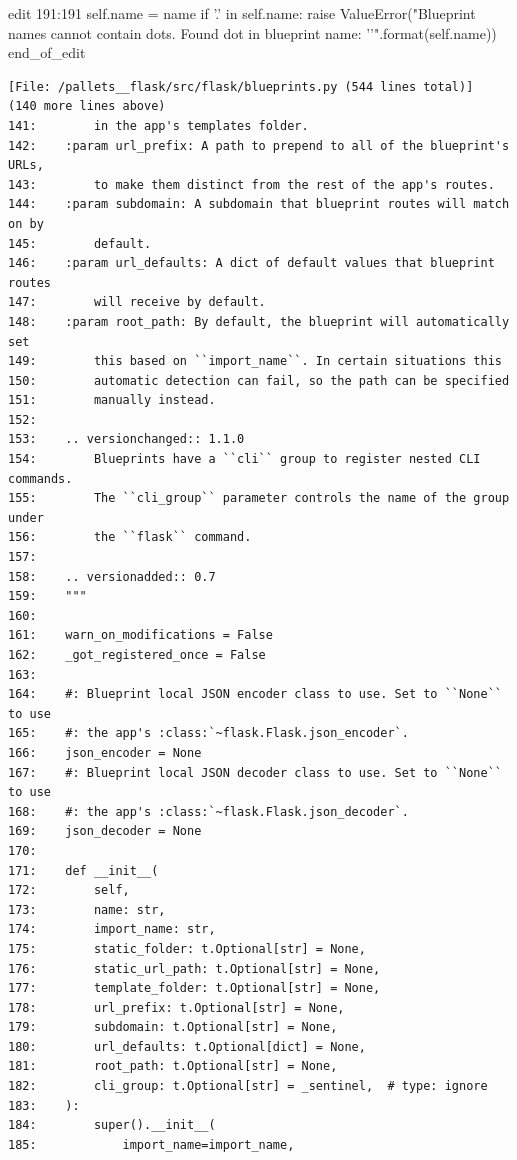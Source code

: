 {\begin{agentbox}
\hrulefill
\begin{CodeVerbatim}[breaklines=true, breakanywhere=true]
edit 191:191
        self.name = name
        if '.' in self.name:
            raise ValueError("Blueprint names cannot contain dots. Found dot in blueprint name: '{}'".format(self.name))
end_of_edit
\end{CodeVerbatim}
\end{agentbox}
\begin{observationbox}\begin{Verbatim}[breaklines=true, breakanywhere=true]
[File: /pallets__flask/src/flask/blueprints.py (544 lines total)]
(140 more lines above)
141:        in the app's templates folder.
142:    :param url_prefix: A path to prepend to all of the blueprint's URLs,
143:        to make them distinct from the rest of the app's routes.
144:    :param subdomain: A subdomain that blueprint routes will match on by
145:        default.
146:    :param url_defaults: A dict of default values that blueprint routes
147:        will receive by default.
148:    :param root_path: By default, the blueprint will automatically set
149:        this based on ``import_name``. In certain situations this
150:        automatic detection can fail, so the path can be specified
151:        manually instead.
152:
153:    .. versionchanged:: 1.1.0
154:        Blueprints have a ``cli`` group to register nested CLI commands.
155:        The ``cli_group`` parameter controls the name of the group under
156:        the ``flask`` command.
157:
158:    .. versionadded:: 0.7
159:    """
160:
161:    warn_on_modifications = False
162:    _got_registered_once = False
163:
164:    #: Blueprint local JSON encoder class to use. Set to ``None`` to use
165:    #: the app's :class:`~flask.Flask.json_encoder`.
166:    json_encoder = None
167:    #: Blueprint local JSON decoder class to use. Set to ``None`` to use
168:    #: the app's :class:`~flask.Flask.json_decoder`.
169:    json_decoder = None
170:
171:    def __init__(
172:        self,
173:        name: str,
174:        import_name: str,
175:        static_folder: t.Optional[str] = None,
176:        static_url_path: t.Optional[str] = None,
177:        template_folder: t.Optional[str] = None,
178:        url_prefix: t.Optional[str] = None,
179:        subdomain: t.Optional[str] = None,
180:        url_defaults: t.Optional[dict] = None,
181:        root_path: t.Optional[str] = None,
182:        cli_group: t.Optional[str] = _sentinel,  # type: ignore
183:    ):
184:        super().__init__(
185:            import_name=import_name,

\end{Verbatim}
\end{observationbox}}
